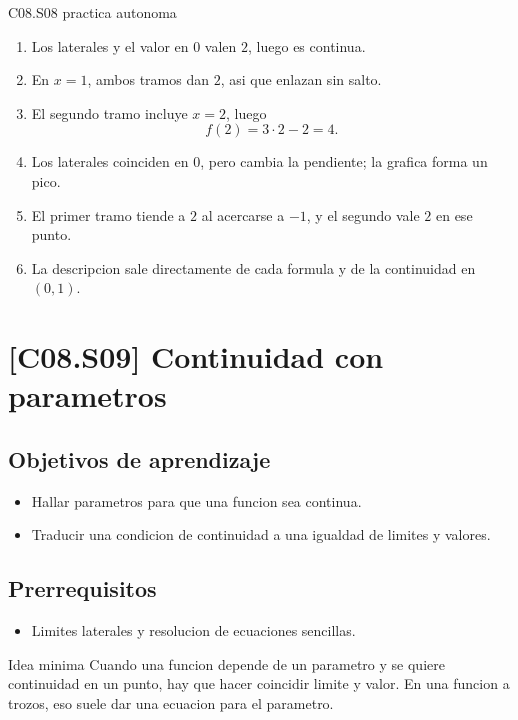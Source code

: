 \begin{fullsolution}{C08.S08 practica autonoma}
\begin{enumerate}[label=\textbf{PX-C08.S08-\arabic*:}, leftmargin=*]
  \item Los laterales y el valor en \(0\) valen \(2\), luego es continua.
  \item En \(x=1\), ambos tramos dan \(2\), asi que enlazan sin salto.
  \item El segundo tramo incluye \(x=2\), luego
  \[
  f(2)=3\cdot 2-2=4.
  \]
  \item Los laterales coinciden en \(0\), pero cambia la pendiente; la grafica forma un pico.
  \item El primer tramo tiende a \(2\) al acercarse a \(-1\), y el segundo vale \(2\) en ese
  punto.
  \item La descripcion sale directamente de cada formula y de la continuidad en \((0,1)\).
\end{enumerate}
\end{fullsolution}

\section{[C08.S09] Continuidad con parametros}

\subsection*{Objetivos de aprendizaje}
\begin{itemize}
  \item Hallar parametros para que una funcion sea continua.
  \item Traducir una condicion de continuidad a una igualdad de limites y valores.
\end{itemize}

\subsection*{Prerrequisitos}
\begin{itemize}
  \item Limites laterales y resolucion de ecuaciones sencillas.
\end{itemize}

\begin{theorybox}{Idea minima}
Cuando una funcion depende de un parametro y se quiere continuidad en un punto, hay que hacer
coincidir limite y valor. En una funcion a trozos, eso suele dar una ecuacion para el
parametro.
\end{theorybox}


